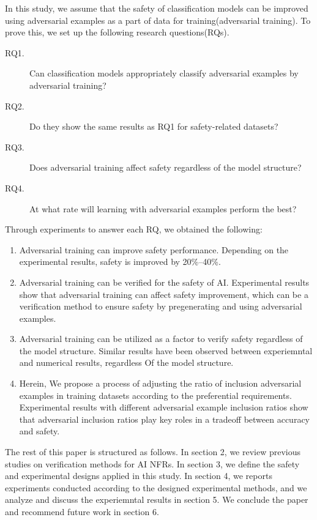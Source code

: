 \documentclass[journal,article,submit,moreauthors,pdftex]{Definitions/mdpi}
\begin{document}
In this study, we assume that the safety of classification models can be improved using adversarial examples as a part of data for training(adversarial training).
To prove this, we set up the following research questions(RQs).

\begin{description}
    \item[RQ1.]	Can classification models appropriately classify adversarial examples by adversarial training?
    \item[RQ2.]	Do they show the same results as RQ1 for safety-related datasets?
    \item[RQ3.] Does adversarial training affect safety regardless of the model structure?
    \item[RQ4.]	At what rate will learning with adversarial examples perform the best?
\end{description}

Through experiments to answer each RQ, we obtained the following:

\begin{enumerate}
    \item	Adversarial training can improve safety performance. Depending on the experimental results, safety is improved by 20\%--40\%.
    \item	Adversarial training can be verified for the safety of AI. Experimental results show that adversarial training can affect safety improvement, which can be a verification method to ensure safety by pregenerating and using adversarial examples.
    \item   Adversarial training can be utilized as a factor to verify safety regardless of the model structure. Similar results have been observed between experiemntal and numerical results, regardless Of the model structure.
    \item	Herein, We propose a process of adjusting the ratio of inclusion adversarial examples in training datasets according to the preferential requirements. Experimental results with different adversarial example inclusion ratios show that adversarial inclusion ratios play key roles in a tradeoff between accuracy and safety.
\end{enumerate} 

The rest of this paper is structured as follows. In section 2, we review previous studies on verification methods for AI NFRs.
In section 3, we define the safety and experimental designs applied in this study.
In section 4, we reports experiments conducted according to the designed experimental methods, and we analyze and discuss the experiemntal results in section 5.
We conclude the paper and recommend future work in section 6.
\end{document}
